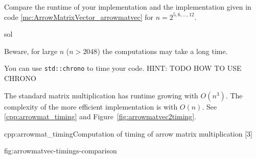 \begin{samproblem}

\begin{subproblem}{}
  Compare the runtime of your implementation and the implementation given in code
  \ref{mc:ArrowMatrixVector_arrowmatvec} for $n=2^{5,6,\ldots,12}$.
 \begin{samwriteprbpart}{sol}
 \begin{samhint}
Beware, for large $n$ ($n > 2048$) the computations may take a long time.
\end{samhint}
 \begin{samhint}
  You can use \texttt{std::chrono} to time your code. HINT: TODO HOW TO USE CHRONO
 \end{samhint}
\begin{samsolution}
The standard matrix multiplication has runtime growing with $O(n^3)$.
The complexity of the more efficient implementation is with $O(n)$.
See \autoref{cpp:arrowmat_timing} and Figure~\ref{fig:arrowmatvec2timing}.

\begin{samcode}[C++11-code]{cpp:arrowmat_timing}{Computation of timing of arrow matrix multiplication}
[3]
\end{samcode}

{fig:arrowmatvec-timings-comparison}

\end{samsolution}
\end{samwriteprbpart}
\end{subproblem}

\end{samproblem}

